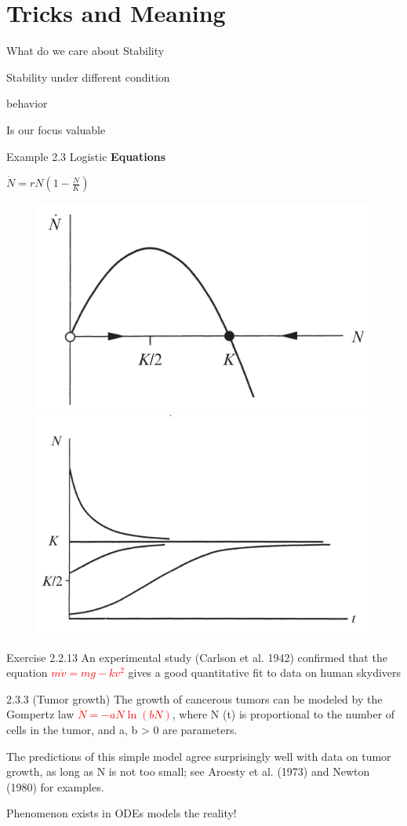 \documentclass[9pt,aspectratio=43,mathserif,table]{beamer}
\begin{document}
\section{Tricks and Meaning}
\begin{frame}{What do we care about}
Stability

\bigskip

Stability under different condition 

\bigskip

behavior

\end{frame}

\begin{frame}{Is our focus valuable}
  \begin{multicols}{2}

  Example 
    2.3
    Logistic \textbf{Equations}

    $\dot N = r N (1 - \frac{ N}{K})$

    \begin{figure}[!h]
      \centering
      \includegraphics[width=.4\textwidth]{fig/logisticEq.png}
      \includegraphics[width=.4\textwidth]{fig/logisticEq_xt.png}
    \end{figure}

  Exercise
    2.2.13
    An experimental study (Carlson et al. 1942) confirmed that the equation
    \textcolor{red}{$m\dot v = mg - kv^2$} gives a good quantitative fit to data on human skydivers

    2.3.3
    (Tumor growth) The growth of cancerous tumors can be modeled by the Gompertz law 
    \textcolor{red}{$\dot N = -a N \ln(bN)$}, where N (t) is proportional to the number of
    cells in the tumor, and a, b > 0 are parameters.

    The predictions of this simple model agree surprisingly well with data on tumor
    growth, as long as N is not too small; see Aroesty et al. (1973) and Newton (1980)
    for examples.


  \end{multicols}
   
  Phenomenon exists in ODEs models the reality!
\end{frame}
\end{document}
